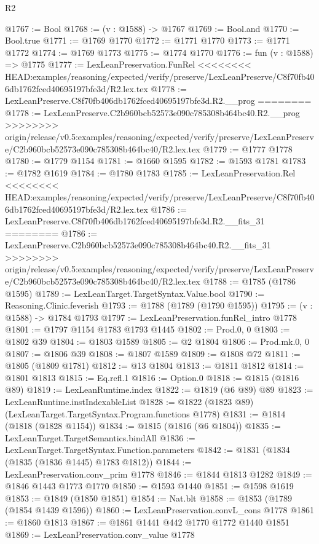 \begin{lexlean}{R2}
\begin{coremodule}
{{{{{{{{{{{{{{{{{{{{{{{{{{{{{{{{{{{{{{{{{{{{{{{{{{{{{{{{{{{{{{{{{{{{{{{{{{{{{{{{{{{{{{{{{{{{@1767 := Bool
@1768 := (v : @1588) -> @1767
@1769 := Bool.and
@1770 := Bool.true
@1771 := @1769 @1770
@1772 := @1771 @1770
@1773 := @1771 @1772
@1774 := @1769 @1773
@1775 := @1774 @1770
@1776 := fun (v : @1588) => @1775
@1777 := LexLeanPreservation.FunRel
<<<<<<<< HEAD:examples/reasoning/expected/verify/preserve/LexLeanPreserve/C8f70fb406db1762fced40695197bfe3d/R2.lex.tex
@1778 := LexLeanPreserve.C8f70fb406db1762fced40695197bfe3d.R2.__prog
========
@1778 := LexLeanPreserve.C2b960bcb52573e090c785308b464bc40.R2.__prog
>>>>>>>> origin/release/v0.5:examples/reasoning/expected/verify/preserve/LexLeanPreserve/C2b960bcb52573e090c785308b464bc40/R2.lex.tex
@1779 := @1777 @1778
@1780 := @1779 @1154
@1781 := @1660 @1595
@1782 := @1593 @1781
@1783 := @1782 @1619
@1784 := @1780 @1783
@1785 := LexLeanPreservation.Rel
<<<<<<<< HEAD:examples/reasoning/expected/verify/preserve/LexLeanPreserve/C8f70fb406db1762fced40695197bfe3d/R2.lex.tex
@1786 := LexLeanPreserve.C8f70fb406db1762fced40695197bfe3d.R2.__fits_31
========
@1786 := LexLeanPreserve.C2b960bcb52573e090c785308b464bc40.R2.__fits_31
>>>>>>>> origin/release/v0.5:examples/reasoning/expected/verify/preserve/LexLeanPreserve/C2b960bcb52573e090c785308b464bc40/R2.lex.tex
@1788 := @1785 (@1786 @1595)
@1789 := LexLeanTarget.TargetSyntax.Value.bool
@1790 := Reasoning.Clinic.feverish
@1793 := @1788 (@1789 (@1790 @1595))
@1795 := (v : @1588) -> @1784 @1793
@1797 := LexLeanPreservation.funRel_intro @1778
@1801 := @1797 @1154 @1783 @1793 @1445
@1802 := Prod.{0, 0}
@1803 := @1802 @39
@1804 := @1803 @1589
@1805 := @2 @1804
@1806 := Prod.mk.{0, 0}
@1807 := @1806 @39
@1808 := @1807 @1589
@1809 := @1808 @72
@1811 := @1805 (@1809 @1781)
@1812 := @13 @1804
@1813 := @1811 @1812
@1814 := @1801 @1813
@1815 := Eq.refl.{1}
@1816 := Option.{0}
@1818 := @1815 (@1816 @89)
@1819 := LexLeanRuntime.index
@1822 := @1819 (@6 @89) @89
@1823 := LexLeanRuntime.instIndexableList
@1828 := @1822 (@1823 @89) (LexLeanTarget.TargetSyntax.Program.functions @1778)
@1831 := @1814 (@1818 (@1828 @1154))
@1834 := @1815 (@1816 (@6 @1804))
@1835 := LexLeanTarget.TargetSemantics.bindAll
@1836 := LexLeanTarget.TargetSyntax.Function.parameters
@1842 := @1831 (@1834 (@1835 (@1836 @1445) @1783 @1812))
@1844 := LexLeanPreservation.conv_prim @1778
@1846 := @1844 @1813 @1282
@1849 := @1846 @1443 @1773 @1770
@1850 := @1593 @1440
@1851 := @1598 @1619
@1853 := @1849 (@1850 @1851)
@1854 := Nat.blt
@1858 := @1853 (@1789 (@1854 @1439 @1596))
@1860 := LexLeanPreservation.convL_cons @1778
@1861 := @1860 @1813
@1867 := @1861 @1441 @442 @1770 @1772 @1440 @1851
@1869 := LexLeanPreservation.conv_value @1778
}}}}}}}}}}}}}}}}}}}}}}}}}}}}}}}}}}}}}}}}}}}}}}}}}}}}}}}}}}}}}}}}}}}}}}}}}}}}}}}}}}}}}}}}}}}}
\end{coremodule}
\end{lexlean}
